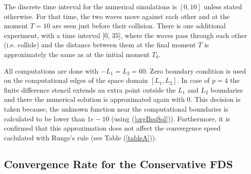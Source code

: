 \documentclass[%
 aip,
cp,  
 amsmath,amssymb,
 reprint,
]{iopconfser}
\newcommand{\rf}[1]{(\ref{#1})}
\begin{document}
The discrete time interval for the numerical simulations is $[0, 10]$ unless stated otherwise. For that time, the two waves move against each other and at the moment $T=10$ are seen just before their collision. There is one additional experiment, with a time interval [0, 35], where the waves pass through each other (i.e. collide) and the distance between them at the final moment $T$ is approximately the same as at the initial moment $T_0$. 

All computations are done with $-L_1 = L_2 = 60$.
Zero boundary condition is used on the computational edges of the space domain $[L_1, L_2]$. In case of $p=4$ the finite difference stencil extends an extra point outside the $L_1$ and $L_2$ boundaries and there the numerical solution is approximated again with $0$. This decision is taken because, the unknown function near the computational boundaries is calculated to be lower than $1e-10$ (using \rf{orgBsqSol}). Furthermore, it is confirmed that
this approximation does not affect the convergence speed caclulated with Runge's rule (see Table \rf{tableA}).

\subsection{Convergence Rate for the Conservative FDS}
\end{document}
